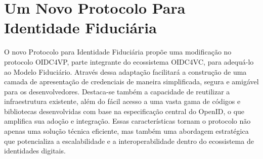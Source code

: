 \chapter{Um Novo Protocolo Para Identidade Fiduciária}\label{ch:protocol}

O novo Protocolo para Identidade Fiduciária propõe uma modificação no protocolo \acs{OIDC4VP}, parte integrante do ecossistema \acs{OIDC4VC}, para adequá-lo ao Modelo Fiduciário. 
Através dessa adaptação facilitará a construção de uma camada de apresentação de credenciais de maneira simplificada, segura e amigável para os desenvolvedores. Destaca-se também a capacidade de reutilizar a infraestrutura existente, além do fácil acesso a uma vasta gama de códigos e bibliotecas desenvolvidas com base na especificação central do OpenID, o que amplifica sua adoção e integração. Essas características tornam o protocolo não apenas uma solução técnica eficiente, mas também uma abordagem estratégica que potencializa a escalabilidade e a interoperabilidade dentro do ecossistema de identidades digitais.




